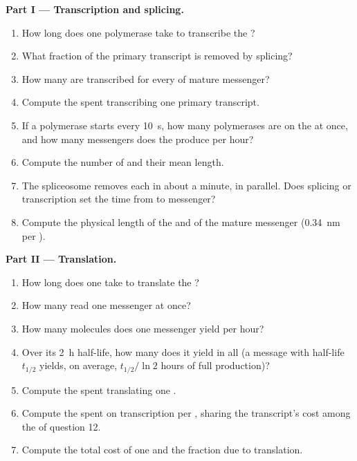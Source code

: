 \begin{problem}
\medskip
\noindent\textbf{Part I --- Transcription and splicing.}
\begin{enumerate}
  \item How long does one polymerase take to transcribe the ?
  \item What fraction of the primary transcript is removed by
        splicing?
  \item How many  are transcribed for every  of
        mature messenger?
  \item Compute the  spent transcribing one primary transcript.
  \item If a polymerase starts every \qty{10}{s}, how many
        polymerases are on the  at once, and how many messengers
        does the  produce per hour?
  \item Compute the number of  and their mean length.
  \item The spliceosome removes each  in about a minute, in
        parallel. Does splicing or transcription set the time from
         to messenger?
  \item Compute the physical length of the  and of the mature
        messenger (\qty{0.34}{nm} per ).
\end{enumerate}

\medskip
\noindent\textbf{Part II --- Translation.}
\begin{enumerate}[resume]
  \item How long does one  take to translate the ?
  \item How many  read one messenger at once?
  \item How many  molecules does one messenger yield per
        hour?
  \item Over its \qty{2}{h} half-life, how many does it yield in all
        (a message with half-life $t_{1/2}$ yields, on average,
        $t_{1/2}/\ln 2$ hours of full production)?
  \item Compute the  spent translating one .
  \item Compute the  spent on transcription per , sharing
        the transcript's cost among the  of question 12.
  \item Compute the total cost of one  and the fraction due to
        translation.
\end{enumerate}


\end{problem}
